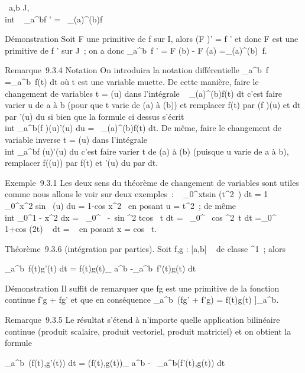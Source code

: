 \documentclass[]{article}
\begin{document}
\forall~a,b \in J, \\int ~
\_a^bf \cdot \phi \phi' =\int ~
\_\phi(a)^\phi(b)f

Démonstration Soit F une primitive de f sur I, alors (F \cdot \phi)' = f \cdot \phi \phi'
et donc F \cdot \phi est une primitive de f \cdot \phi \phi' sur J~; on a donc
\int  \_a^b~f \cdot \phi \phi' = F \cdot \phi(b) - F
\cdot \phi(a) =\int  \_\phi(a)^\phi(b)~f.

Remarque~9.3.4 Notation On introduira la notation différentielle
\int  \_a^b~f
=\int  \_a^b~f(t) dt où t est une
variable muette. De cette manière, faire le changement de variables t =
\phi(u) dans l'intégrale \int ~
\_\phi(a)^\phi(b)f(t) dt c'est faire varier u de a à b (pour que
t varie de \phi(a) à \phi(b)) et remplacer f(t) par (f \cdot \phi)(u) et dt par \phi'(u)
du si bien que la formule ci dessus s'écrit \\int
 \_a^b(f \cdot \phi)(u)\phi'(u) du =\int ~
\_\phi(a)^\phi(b)f(t) dt. De même, faire le changement de
variable inverse t = \phi(u) dans l'intégrale \\int
 \_a^bf \cdot \phi(u)\phi'(u) du c'est faire varier t de \phi(a) à
\phi(b) (puisque u varie de a à b), remplacer f(\phi(u)) par f(t) et \phi'(u) du
par dt.

Exemple~9.3.1 Les deux sens du théorème de changement de variables sont
utiles comme nous allons le voir sur deux exemples~:
\int ~
\_0^xtsin (t^2~) dt =
1  \int ~
\_0^x^2  sin~ (u) du
= 1-cos x^2~  en posant u = t^2~; de même \\int
 \_0^1 - x^2 dx
=\int ~
\_0^\pi~ -\
sin ^2  tcos~ t dt
=\int ~
\_0^\pi~ cos ^2~t dt
=\int  \_0^\pi~\diagup2~
1+cos (2t) ~ dt = \pi~
 en posant x = cos~ t.

Théorème~9.3.6 (intégration par parties). Soit f,g : {[}a,b{]} \rightarrow~  de
classe \mathcal{C}^1~; alors

\int  \_a^b~f(t)g'(t) dt =
\left {[}f(t)g(t)\right {]}\_
a^b -\int  \_a^b~f'(t)g(t)
dt

Démonstration Il suffit de remarquer que fg est une primitive de la
fonction continue f'g + fg' et que en conséquence
\int  \_a^b~(fg' + f'g) =
\left {[}f(t)g(t)\right
{]}\_a^b.

Remarque~9.3.5 Le résultat s'étend à n'importe quelle application
bilinéaire continue \phi (produit scalaire, produit vectoriel, produit
matriciel) et on obtient la formule

\int  \_a^b~\phi(f(t),g'(t)) dt =
\left {[}\phi(f(t),g(t))\right {]}\_
a^b -\int ~
\_a^b\phi(f'(t),g(t)) dt
\end{document}

